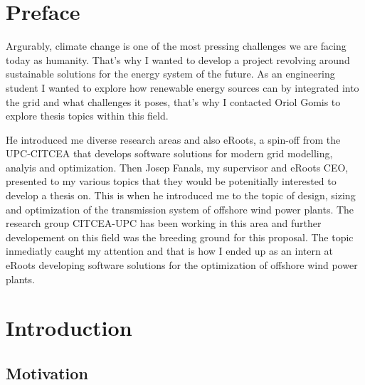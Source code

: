 \documentclass[a4paper,11pt, titlepage, twoside]{article}
\begin{document}
\printnomenclature


\listoffigures

\listoftables




\section{Preface}

Argurably, climate change is one of the most pressing challenges we are facing today as humanity.
That's why I wanted to develop a project revolving around sustainable solutions for the 
energy system of the future. As an engineering student I wanted to explore how renewable 
energy sources can by integrated into the grid and what challenges it poses, that's why I 
contacted Oriol Gomis to explore thesis topics within this field.\par

He introduced me diverse research areas and also eRoots, a spin-off from the UPC-CITCEA
that develops software solutions for modern grid modelling, analyis and optimization. Then Josep Fanals, my supervisor
and eRoots CEO, presented to my various topics that they would be potenitially interested to develop a thesis on. This is when 
he introduced me to the topic of design, sizing and optimization of the transmission system of offshore wind power plants. The research 
group CITCEA-UPC has been working in this area \cite{paperbase} and further developement on this field was the breeding ground for this proposal.
The topic inmediatly caught my attention and that is how I ended up as an intern at eRoots developing software solutions for the optimization of offshore wind power plants.

\section{Introduction}\label{Introduction}

\subsection{Motivation}
\end{document}
